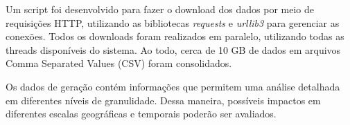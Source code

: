 Um script foi desenvolvido para fazer o download dos dados por meio de requisições HTTP, utilizando as bibliotecas 
\textit{requests} e \textit{urllib3} para gerenciar as conexões. Todos os downloads foram realizados em paralelo, utilizando 
todas as threads disponíveis do sistema. Ao todo, cerca de 10 GB de dados em arquivos Comma Separated Values (CSV) foram consolidados.

\begin{table}[htb]
  \centering
    {
    }
\end{table}

Os dados de geração contém informações que permitem uma análise detalhada em diferentes níveis de granulidade. Dessa maneira, 
possíveis impactos em diferentes escalas geográficas e temporais poderão ser avaliados.

